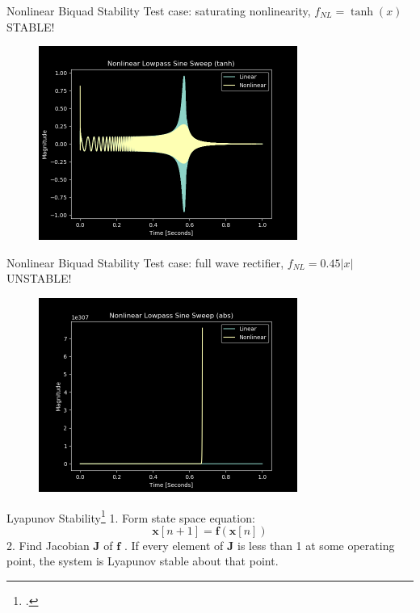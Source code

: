 \begin{frame}{Nonlinear Biquad Stability}
    Test case: saturating nonlinearity, $f_{NL} = \tanh(x)$ \rightarrow STABLE!
    \begin{figure}
        \includegraphics[height=2.5in]{Figures/nl_lpf_stable.png}
    \end{figure}
\end{frame}

\begin{frame}{Nonlinear Biquad Stability}
    Test case: full wave rectifier, $f_{NL} = 0.45 |x|$ \rightarrow UNSTABLE!
    \begin{figure}
        \includegraphics[height=2.5in]{Figures/nl_lpf_unstable.png}
    \end{figure}
\end{frame}

\begin{frame}{Lyapunov Stability\footcite{Lyapunov}}
    1. Form state space equation:
    \begin{equation}
        \mathbf{x}[n+1] = \mathbf{f}(\mathbf{x}[n])
    \end{equation}
    2. Find Jacobian $\mathbf{J}$ of $\mathbf{f}$
    \newline{}. If every element of $\mathbf{J}$ is less than 1
    at some operating point, the system is Lyapunov
    stable about that point.
\end{frame}

